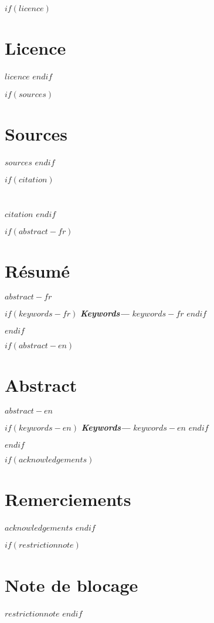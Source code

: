 \renewcommand{\contentsname}{Table des matières}
\renewcommand{\figurename}{Illustration}
\renewcommand{\listfigurename}{Table des figures}

$if(licence)$
    \chapter*{Licence}
    $licence$
$endif$

$if(sources)$
    \chapter*{Sources}
    $sources$
$endif$

$if(citation)$
    \chapter*{}
    $citation$
$endif$

\providecommand{\keywords}[1]{\textbf{\textit{Keywords---}} #1}

$if(abstract-fr)$
\clearpage
\begin{minipage}{\linewidth}
    
    \chapter*{Résumé}
    $abstract-fr$
    
    \vspace*{1cm}
    
    $if(keywords-fr)$
        \keywords{$keywords-fr$}
    $endif$
    
\end{minipage}
\clearpage
$endif$

$if(abstract-en)$
    \clearpage
    \begin{minipage}{\linewidth}
    \chapter*{Abstract}
    $abstract-en$

    \vspace*{1cm}

    $if(keywords-en)$
        \keywords{$keywords-en$}
    $endif$

    \end{minipage}
    \clearpage
$endif$



$if(acknowledgements)$
\chapter*{Remerciements}
$acknowledgements$
$endif$

$if(restrictionnote)$
\chapter*{Note de blocage}
$restrictionnote$
$endif$

\cleardoublepage